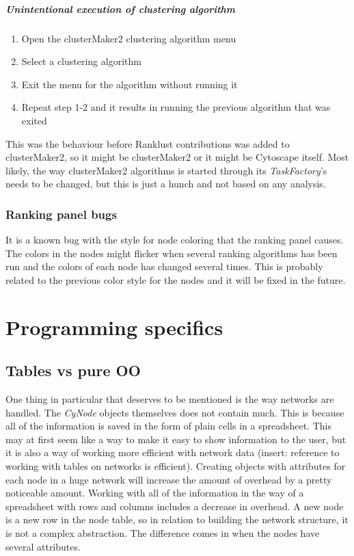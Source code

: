 \paragraph{Unintentional execution of clustering algorithm}
\begin{enumerate}
    \item Open the clusterMaker2 clustering algorithm menu
    \item Select a clustering algorithm
    \item Exit the menu for the algorithm without running it
    \item Repeat step 1-2 and it results in running the previous algorithm that
        was exited
\end{enumerate}
This was the behaviour before Ranklust contributions was added to clusterMaker2,
so it might be clusterMaker2 or it might be Cytoscape itself. Most likely, the
way clusterMaker2 algorithms is started through its \textit{TaskFactory}'s needs
to be changed, but this is just a hunch and not based on any analysis.

\subsection{Ranking panel bugs}
It is a known bug with the style for node coloring that the ranking panel
causes. The colors in the nodes might flicker when several ranking algorithms
has been run and the colors of each node has changed several times. This is
probably related to the previous color style for the nodes and it will be fixed
in the future.

\chapter{Programming specifics}
\section{Tables vs pure OO}
One thing in particular that deserves to be mentioned is the way networks are
handled. The \textit{CyNode} objects themselves does not contain much. This is
because all of the information is saved in the form of plain cells in a
spreadsheet. This may at first seem like a way to make it easy to show
information to the user, but it is also a way of working more efficient with
network data (insert: reference to working with tables on networks is
efficient). Creating objects with attributes for each node in a huge network
will increase the amount of overhead by a pretty noticeable amount. Working with
all of the information in the way of a spreadsheet with rows and columns
includes a decrease in overhead. A new node is a new row in the node table, so
in relation to building the network structure, it is not a complex abstraction.
The difference comes in when the nodes have several attributes. 


